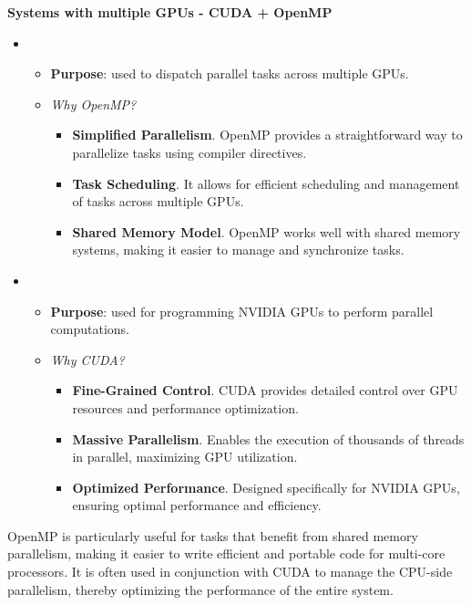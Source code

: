 \highspace
\begin{flushleft}
  \textcolor{Green3}{ \textbf{Systems with multiple GPUs - CUDA + OpenMP}}
\end{flushleft}
\begin{itemize}
  \item {}
  \begin{itemize}
    \item \textbf{Purpose}: used to dispatch parallel tasks across multiple GPUs.
    \item \emph{Why OpenMP?}
    \begin{itemize}
      \item \textbf{Simplified Parallelism}. OpenMP provides a straightforward way to parallelize tasks using compiler directives.
      \item \textbf{Task Scheduling}. It allows for efficient scheduling and management of tasks across multiple GPUs.
      \item \textbf{Shared Memory Model}. OpenMP works well with shared memory systems, making it easier to manage and synchronize tasks.
    \end{itemize}
  \end{itemize}

  \item {}
  \begin{itemize}
    \item \textbf{Purpose}: used for programming NVIDIA GPUs to perform parallel computations.
    \item \emph{Why CUDA?}
    \begin{itemize}
      \item \textbf{Fine-Grained Control}. CUDA provides detailed control over GPU resources and performance optimization.
      \item \textbf{Massive Parallelism}. Enables the execution of thousands of threads in parallel, maximizing GPU utilization.
      \item \textbf{Optimized Performance}. Designed specifically for NVIDIA GPUs, ensuring optimal performance and efficiency.
    \end{itemize}
  \end{itemize}
\end{itemize}
OpenMP is particularly useful for tasks that benefit from shared memory parallelism, making it easier to write efficient and portable code for multi-core processors. It is often used in conjunction with CUDA to manage the CPU-side parallelism, thereby optimizing the performance of the entire system.

